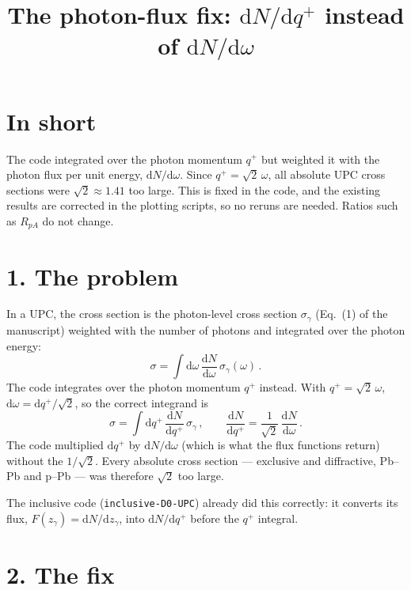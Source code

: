 \documentclass[12pt]{article}
\title{The photon-flux fix: $\mathrm{d}N/\mathrm{d}q^+$ instead of $\mathrm{d}N/\mathrm{d}\omega$}
\author{}
\date{}
\begin{document}
\maketitle

\section*{In short}

The code integrated over the photon momentum $q^+$ but weighted it with the photon flux per unit
energy, $\mathrm{d}N/\mathrm{d}\omega$. Since $q^+=\sqrt2\,\omega$, all absolute UPC cross sections
were $\sqrt2\approx1.41$ too large. This is fixed in the code, and the existing results are
corrected in the plotting scripts, so no reruns are needed. Ratios such as $R_{pA}$ do not change.

\section*{1. The problem}

In a UPC, the cross section is the photon-level cross section $\sigma_\gamma$ (Eq.~(1) of the
manuscript) weighted with the number of photons and integrated over the photon energy:
\[
  \sigma=\int\mathrm{d}\omega\,\frac{\mathrm{d}N}{\mathrm{d}\omega}\,\sigma_\gamma(\omega)\,.
\]
The code integrates over the photon momentum $q^+$ instead. With $q^+=\sqrt2\,\omega$,
$\mathrm{d}\omega=\mathrm{d}q^+/\sqrt2$, so the correct integrand is
\[
  \sigma=\int\mathrm{d}q^+\,\frac{\mathrm{d}N}{\mathrm{d}q^+}\,\sigma_\gamma\,,\qquad
  \frac{\mathrm{d}N}{\mathrm{d}q^+}=\frac{1}{\sqrt2}\,\frac{\mathrm{d}N}{\mathrm{d}\omega}\,.
\]
The code multiplied $\mathrm{d}q^+$ by $\mathrm{d}N/\mathrm{d}\omega$ (which is what the flux functions
return) without the $1/\sqrt2$. Every absolute cross section --- exclusive and diffractive, Pb--Pb and
p--Pb --- was therefore $\sqrt2$ too large.

The inclusive code (\texttt{inclusive-D0-UPC}) already did this correctly: it converts its flux,
$F(z_\gamma)=\mathrm{d}N/\mathrm{d}z_\gamma$, into $\mathrm{d}N/\mathrm{d}q^+$ before the $q^+$ integral.

\section*{2. The fix}
\end{document}
